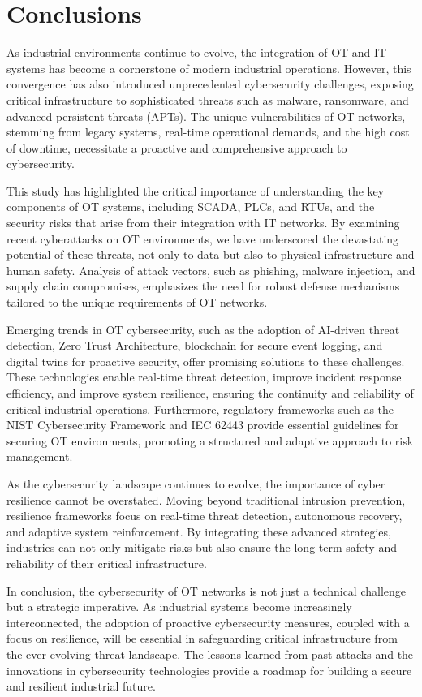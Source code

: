 \section{Conclusions}
\label{sec:conclusion}
As industrial environments continue to evolve, the integration of OT and IT systems has become a cornerstone of modern industrial operations. However, this convergence has also introduced unprecedented cybersecurity challenges, exposing critical infrastructure to sophisticated threats such as malware, ransomware, and advanced persistent threats (APTs). The unique vulnerabilities of OT networks, stemming from legacy systems, real-time operational demands, and the high cost of downtime, necessitate a proactive and comprehensive approach to cybersecurity.

This study has highlighted the critical importance of understanding the key components of OT systems, including SCADA, PLCs, and RTUs, and the security risks that arise from their integration with IT networks. By examining recent cyberattacks on OT environments, we have underscored the devastating potential of these threats, not only to data but also to physical infrastructure and human safety. Analysis of attack vectors, such as phishing, malware injection, and supply chain compromises, emphasizes the need for robust defense mechanisms tailored to the unique requirements of OT networks.

Emerging trends in OT cybersecurity, such as the adoption of AI-driven threat detection, Zero Trust Architecture, blockchain for secure event logging, and digital twins for proactive security, offer promising solutions to these challenges. These technologies enable real-time threat detection, improve incident response efficiency, and improve system resilience, ensuring the continuity and reliability of critical industrial operations. Furthermore, regulatory frameworks such as the NIST Cybersecurity Framework and IEC 62443 provide essential guidelines for securing OT environments, promoting a structured and adaptive approach to risk management.

As the cybersecurity landscape continues to evolve, the importance of cyber resilience cannot be overstated. Moving beyond traditional intrusion prevention, resilience frameworks focus on real-time threat detection, autonomous recovery, and adaptive system reinforcement. By integrating these advanced strategies, industries can not only mitigate risks but also ensure the long-term safety and reliability of their critical infrastructure.

In conclusion, the cybersecurity of OT networks is not just a technical challenge but a strategic imperative. As industrial systems become increasingly interconnected, the adoption of proactive cybersecurity measures, coupled with a focus on resilience, will be essential in safeguarding critical infrastructure from the ever-evolving threat landscape. The lessons learned from past attacks and the innovations in cybersecurity technologies provide a roadmap for building a secure and resilient industrial future.